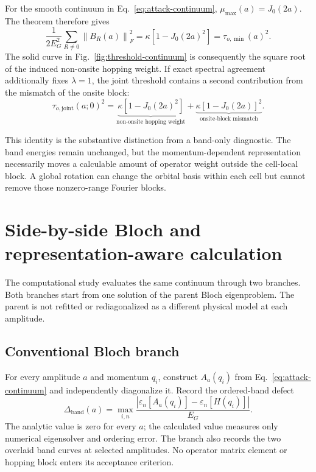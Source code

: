 \documentclass[11pt]{article}
\newcommand{\norm}[1]{\left\lVert #1\right\rVert}
\begin{document}
For the smooth continuum in Eq.~\eqref{eq:attack-continuum},
$\mu_{\max}(a)=J_0(2a)$. The theorem therefore gives
\begin{equation}
 \frac{1}{2E_G^2}\sum_{R\ne0}\norm{B_R(a)}_F^2
 =\kappa\left[1-J_0(2a)^2\right]
 =\tau_{o,\min}(a)^2.
 \label{eq:continuum-tail-identity}
\end{equation}
The solid curve in Fig.~\ref{fig:threshold-continuum} is consequently the square root of
the induced non-onsite hopping weight. If exact spectral agreement additionally fixes
$\lambda=1$, the joint threshold contains a second contribution from the mismatch of
the onsite block:
\begin{equation}
 \tau_{o,\mathrm{joint}}(a;0)^2
 =\underbrace{\kappa\left[1-J_0(2a)^2\right]}_{\text{non-onsite hopping weight}}
 +\underbrace{\kappa\left[1-J_0(2a)\right]^2}_{\text{onsite-block mismatch}}.
 \label{eq:joint-threshold-locality-decomposition}
\end{equation}

This identity is the substantive distinction from a band-only diagnostic. The band
energies remain unchanged, but the momentum-dependent representation necessarily moves
a calculable amount of operator weight outside the cell-local block. A global rotation
can change the orbital basis within each cell but cannot remove those nonzero-range
Fourier blocks.

\section{Side-by-side Bloch and representation-aware calculation}

The computational study evaluates the same continuum through two branches. Both branches
start from one solution of the parent Bloch eigenproblem. The parent is not refitted or
rediagonalized as a different physical model at each amplitude.

\subsection{Conventional Bloch branch}

For every amplitude $a$ and momentum $q_i$, construct $A_a(q_i)$ from
Eq.~\eqref{eq:attack-continuum} and independently diagonalize it. Record the ordered-band
defect
\begin{equation}
 \Delta_{\mathrm{band}}(a)
 =\max_{i,n}
 \frac{|\varepsilon_n[A_a(q_i)]-\varepsilon_n[H(q_i)]|}{E_G}.
 \label{eq:band-continuum-defect}
\end{equation}
The analytic value is zero for every $a$; the calculated value measures only numerical
eigensolver and ordering error. The branch also records the two overlaid band curves at
selected amplitudes. No operator matrix element or hopping block enters its acceptance
criterion.
\end{document}
